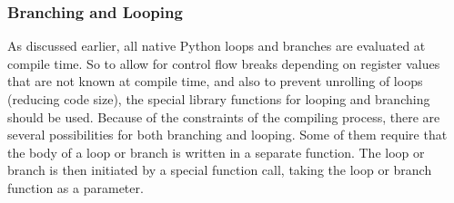 \subsubsection{Branching and Looping}
As discussed earlier, all native Python loops and branches are evaluated at
compile time. So to allow for control flow breaks depending on register values
that are not known at compile time, and also to prevent unrolling of loops
(reducing code size), the special
library functions for looping and branching should be used.
Because of the constraints of the compiling process, there are several
possibilities for both branching and looping.
Some of them require that the body of a loop or branch is written
in a separate function. The loop or branch is then initiated by a special
function call, taking the loop or branch function as a parameter.

